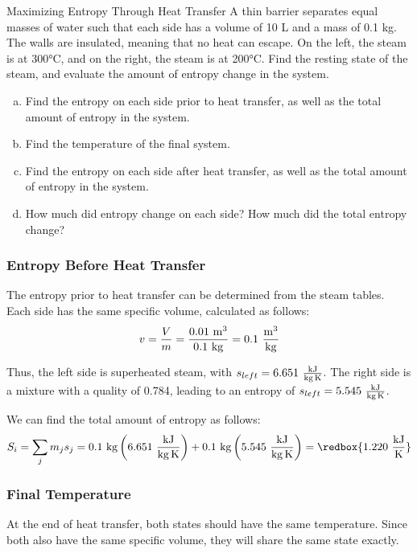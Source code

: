\begin{example}[label=ex:entropyMaximization]{Maximizing Entropy Through Heat Transfer}
  A thin barrier separates equal masses of water such that each side has a volume of 10 L and a mass of 0.1 kg.  The walls are insulated, meaning that no heat can escape.  On the left, the steam is at 300°C, and on the right, the steam is at 200°C.  Find the resting state of the steam, and evaluate the amount of entropy change in the system.

  \begin{enumerate}[a)]
  \item Find the entropy on each side prior to heat transfer, as well as the total amount of entropy in the system.
  \item Find the temperature of the final system.
  \item Find the entropy on each side after heat transfer, as well as the total amount of entropy in the system.
  \item How much did entropy change on each side?  How much did the total entropy change?
  \end{enumerate}
  \subsubsection*{Entropy Before Heat Transfer}
  The entropy prior to heat transfer can be determined from the steam tables.
  Each side has the same specific volume, calculated as follows:
  \begin{equation*}
    v = \frac{V}{m} = \frac{0.01\ \rm m^3}{0.1\ \rm kg} = 0.1\ \frac{\rm m^3}{\rm kg}
  \end{equation*}

  Thus, the left side is superheated steam, with $s_{left}=6.651\ \frac{\rm kJ}{\rm kg\,K}$.  The right side is a mixture with a quality of 0.784, leading to an entropy of $s_{left}=5.545\ \frac{\rm kJ}{\rm kg\,K}$.

  We can find the total amount of entropy as follows:
  \begin{equation*}
    S_i = \sum_j m_js_j = 0.1\ {\rm kg} \left(6.651\ \frac{\rm kJ}{\rm kg\,K}\right) + 0.1\ {\rm kg} \left(5.545\ \frac{\rm kJ}{\rm kg\,K}\right) = \redbox{ 1.220 \ \frac{\rm kJ}{\rm K}}
  \end{equation*}
  
  \subsubsection*{Final Temperature}
  At the end of heat transfer, both states should have the same temperature.  Since both also have the same specific volume, they will share the same state exactly.


\end{example}

